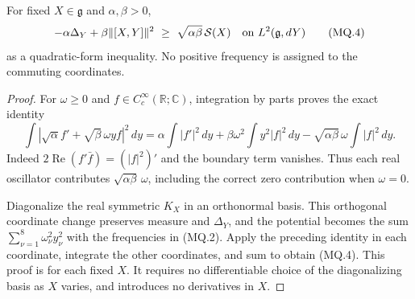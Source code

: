 \begin{lemma}
\label{qh:matrix-slice}
For fixed $X\in\mathfrak g$ and $\alpha,\beta>0$,
\[
 -\alpha\Delta_Y+\beta\|[X,Y]\|^2
 \ \geq\ \sqrt{\alpha\beta}\,\mathcal S(X)
 \quad\hbox{on }L^2(\mathfrak g,dY)                           \tag{MQ.4}
\]
as a quadratic-form inequality. No positive frequency is assigned to
the commuting coordinates.
\end{lemma}
\begin{proof}
For $\omega\geq0$ and $f\in C_c^\infty(\mathbb R;\mathbb C)$,
integration by parts proves the exact identity
\[
 \int|\sqrt\alpha f'+\sqrt\beta\,\omega y f|^2\,dy
 =\alpha\int|f'|^2\,dy+
   \beta\omega^2\int y^2|f|^2\,dy
   -\sqrt{\alpha\beta}\,\omega\int|f|^2\,dy .
\]
Indeed $2\operatorname{Re}(f'\bar f)=(|f|^2)'$ and the boundary
term vanishes. Thus each real oscillator contributes
$\sqrt{\alpha\beta}\,\omega$, including the correct zero contribution
when $\omega=0$.

Diagonalize the real symmetric $K_X$ in an orthonormal basis. This
orthogonal coordinate change preserves measure and $\Delta_Y$, and
the potential becomes the sum $\sum_{\nu=1}^8\omega_\nu^2 y_\nu^2$
with the frequencies in (MQ.2). Apply the preceding identity in
each coordinate, integrate the other coordinates, and sum to obtain
(MQ.4). This proof is for each fixed $X$. It requires no differentiable
choice of the diagonalizing basis as $X$ varies, and introduces no
derivatives in $X$.
\end{proof}

